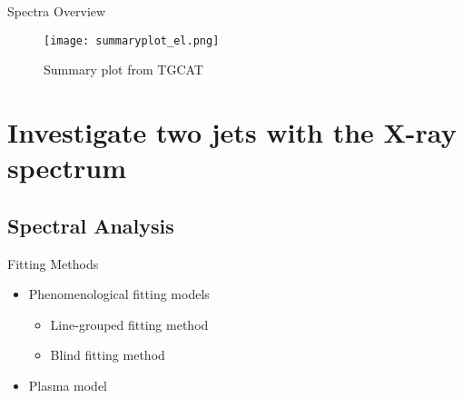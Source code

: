 \documentclass{beamer}
\begin{document}
\begin{frame}{Spectra Overview}

\begin{figure}
    \centering
    \texttt{[image: summaryplot\_el.png]}
    \caption{Summary plot from TGCAT}
    \label{summary}
\end{figure}
    
\end{frame}


   
    
\section{Investigate two jets with the X-ray spectrum}
\normalsize
\subsection{Spectral Analysis}
\begin{frame}{Fitting Methods}
    \begin{itemize}
        \item Phenomenological fitting models
        \begin{itemize}
            \item Line-grouped fitting method
            \item Blind fitting method
        \end{itemize}
        \item Plasma model
    \end{itemize}
    
\end{frame}
\end{document}
